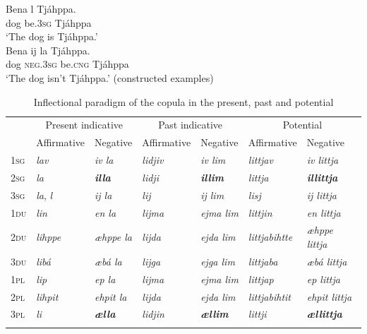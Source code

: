 \documentclass[output=paper,colorlinks,citecolor=brown]{langscibook}
\begin{document}
\ea\label{ex:lul:iv}
    \ea
    \gll Bena l Tjáhppa.\\
        dog be.\textsc{3sg} Tjáhppa\\
    \glt ‘The dog is Tjáhppa.’\\
    \ex 
    \gll Bena ij la Tjáhppa.\\
        dog \textsc{neg.3sg} be.\textsc{cng} Tjáhppa \\
    \glt ‘The dog isn’t Tjáhppa.’ (constructed examples)
\z \z 

\begin{table}
\small 
\begin{tabularx}{\textwidth}{lXlXlXl@{~}}
\lsptoprule
& \multicolumn{2}{c}{{Present indicative}} & \multicolumn{2}{c}{{Past indicative}} & \multicolumn{2}{c}{{Potential}}\\
& {Affirmative } & {Negative} & {Affirmative } & {Negative} & {Affirmative } & {Negative}\\
\midrule 
{\scshape 1sg} & {\itshape lav} & {\textit{iv la}} & {\itshape lidjiv}  & {\textit{iv lim}} & {\itshape littjav} & {\textit{iv littja}}\\
{\textsc{2sg}} & {\itshape la} & {\bfseries\itshape illa} & {\itshape lidji}  & {\bfseries\itshape illim} & {\itshape littja} & {\bfseries\itshape illittja}\\
{\textsc{3sg}} & {\textit{la}, \textit{l}} & {\itshape ij la} & {\itshape lij} & {\itshape ij lim} & {\itshape lisj} & {\itshape ij littja}\\
{\textsc{1du}} & {\itshape lin}  & {\itshape en la} & {\itshape lijma}  & {\itshape ejma lim} & {\itshape littjin} & {\itshape en littja}\\
{\textsc{2du}} & {\itshape lihppe}  & {\itshape æhppe la} & {\itshape lijda}  & {\itshape ejda lim} & {\itshape littjabihtte} & {\itshape æhppe littja}\\
{\textsc{3du}} & {\itshape libá}  & {\itshape æbá la} & {\itshape lijga}  & {\itshape ejga lim} & {\itshape littjaba} & {\itshape æbá littja}\\
{\textsc{1pl}} & {\itshape lip}  & {\itshape ep la} & {\itshape lijma}  & {\itshape ejma lim} & {\itshape littjap} & {\itshape ep littja}\\
{\textsc{2pl}} & {\itshape lihpit}  & {\itshape ehpit la} & {\itshape lijda}  & {\itshape ejda lim} & {\itshape littjabihtit} & {\itshape ehpit littja}\\
{\textsc{3pl}} & {\itshape li} & {\bfseries\itshape ælla} & {\itshape lidjin} & {\bfseries\itshape ællim} & {\itshape littji} & {\bfseries\itshape ællittja}\\
\lspbottomrule
\end{tabularx}
  \caption{Inflectional paradigm of the copula in the present, past and potential}
    \label{tab:lul:6}
\end{table}
\end{document}
